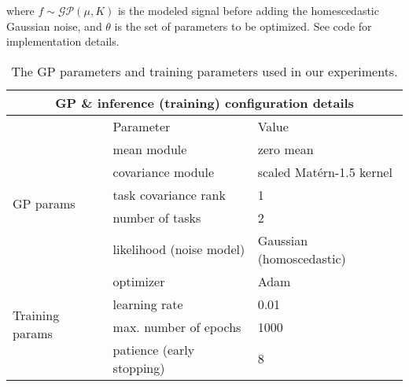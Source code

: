 where $f \sim \mathcal{GP}(\mu, K)$ is the modeled signal before adding the homescedastic Gaussian noise, and $\theta$ is the set of parameters to be optimized. See code for implementation details.

\begin{table}[h]
\begin{tabular}{ |p{3cm}||p{5cm}||p{5cm}| }
 \hline
 \multicolumn{3}{|c|}{GP \& inference (training) configuration details} \\
 \hline
  &Parameter& Value \\
 \hline
\multirow{5}{3cm}{GP params} & mean module & zero mean\\
&covariance module& scaled Matérn-1.5 kernel\\
&task covariance rank& 1 \\
&number of tasks& 2   \\
&likelihood (noise model)&Gaussian (homoscedastic)\\
\hline
\multirow{4}{3cm}{Training params}& optimizer &Adam\\
&learning rate& 0.01 \\
&max. number of epochs & 1000\\
&patience (early stopping)&8 \\
 \hline
\end{tabular}
\caption{The GP parameters and training parameters used in our experiments.}
\label{table:GPTraining}
\end{table}


